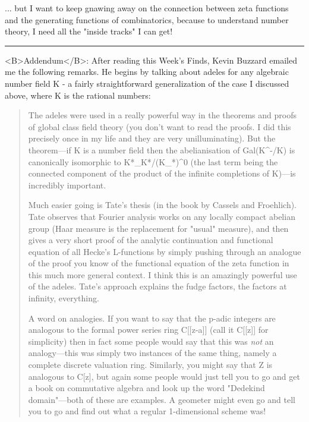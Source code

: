 ... but I want to keep gnawing away on the connection between zeta functions
and the generating functions of combinatorics, because to understand number 
theory, I need all the "inside tracks" I can get!
\par\noindent\rule{\textwidth}{0.4pt}
<B>Addendum</B>: 
After reading this Week's Finds, Kevin Buzzard emailed me the
following remarks.  He begins by talking about adeles for any
algebraic number field K - a fairly straightforward generalization of
the case I discussed above, where K is the rational numbers:

\begin{quote}
 The adeles were used in a really powerful way in the theorems and proofs
 of global class field theory (you don't want to read the proofs. I did
 this precisely once in my life and they are very unilluminating).  But the
 theorem---if K is a number field then the abelianisation of 
  Gal(K^{-}/K)
  is canonically isomorphic to 
K*\Adeles_{K}*/(K_{\infty }*)^{0}
 (the last term being the connected component of the product of the
 infinite completions of K)---is incredibly important.

  Much easier going is Tate's thesis (in the book by Cassels and Froehlich).
 Tate observes that Fourier analysis works on any locally compact abelian 
 group (Haar measure is the replacement for "usual" measure), and then gives 
 a very short proof of the analytic continuation and functional equation of
 all Hecke's L-functions by simply pushing through an analogue of the proof
 you know of the functional equation of the zeta function in this much more
 general context.  I think this is an amazingly powerful use of the adeles.
 Tate's approach explains the fudge factors, the factors at infinity,
 everything.

 A word on analogies.  If you want to say that the p-adic integers are 
 analogous to the formal power series ring C[[z-a]] (call it C[[z]] 
 for simplicity) then in fact some people would say that this was \emph{not} 
 an analogy---this was simply two instances of the same thing, namely a 
 complete discrete valuation ring. Similarly, you might say that Z is 
 analogous to C[z], but again some people would just tell you to go and 
 get a book on commutative algebra and look up the word "Dedekind 
 domain"---both of these are examples. A geometer might even go and 
 tell you to go and find out what a regular 1-dimensional scheme was!


\end{quote}
